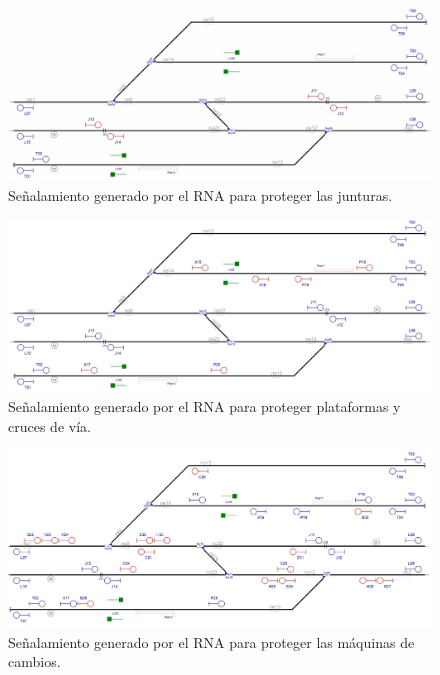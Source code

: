     \begin{figure}[h]
        \centering
        \includegraphics[width=1\textwidth]{resultados-obtenidos/ejemplo1/images/1_step2.png}
        \centering\caption{Señalamiento generado por el RNA para proteger las junturas.}
    \end{figure}

    \begin{figure}[h]
        \centering
        \includegraphics[width=1\textwidth]{resultados-obtenidos/ejemplo1/images/1_step3.png}
        \centering\caption{Señalamiento generado por el RNA para proteger plataformas y cruces de vía.}
    \end{figure}

    \begin{figure}[h]
        \centering
        \includegraphics[width=1\textwidth]{resultados-obtenidos/ejemplo1/images/1_step4.png}
        \centering\caption{Señalamiento generado por el RNA para proteger las máquinas de cambios.}
    \end{figure}

